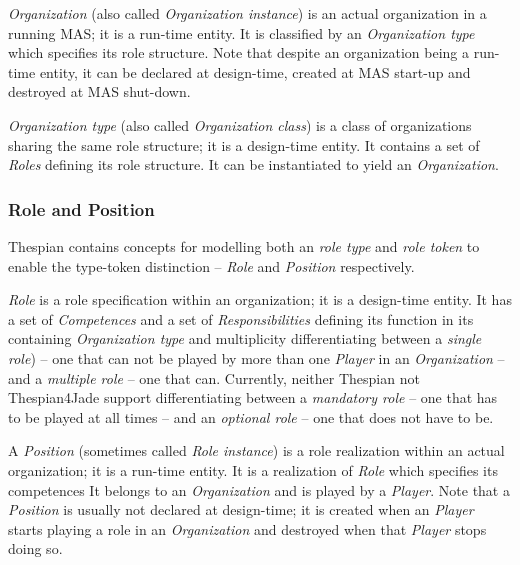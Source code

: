\textit{Organization} (also called \textit{Organization instance}) is an actual organization in a running MAS; it is a run-time entity.
It is classified by an \textit{Organization type} which specifies its role structure.
Note that despite an organization being a run-time entity, it can be declared at design-time, created at MAS start-up and destroyed at MAS shut-down.

\textit{Organization type} (also called \textit{Organization class}) is a class of organizations sharing the same role structure; it is a design-time entity.
It contains a set of \textit{Roles} defining its role structure.
It can be instantiated to yield an \textit{Organization}. 

\subsubsection*{Role and Position}

Thespian contains concepts for modelling both an \textit{role type} and \textit{role token} to enable the type-token distinction -- \textit{Role} and \textit{Position} respectively.

\textit{Role} is a role specification within an organization; it is a design-time entity.
It has a set of \textit{Competences} and a set of \textit{Responsibilities} defining its function in its containing \textit{Organization type} and multiplicity differentiating between a \textit{single role}) -- one that can not be played by more than one \textit{Player} in an \textit{Organization} -- and a \textit{multiple role} -- one that can.
Currently, neither Thespian not Thespian4Jade support differentiating between a \textit{mandatory role} -- one that has to be played at all times -- and an \textit{optional role} -- one that does not have to be.

A \textit{Position} (sometimes called \textit{Role instance}) is a role realization within an actual organization; it is a run-time entity.
It is a realization of \textit{Role} which specifies its competences
It belongs to an \textit{Organization} and is played by a \textit{Player}.
Note that a \textit{Position} is usually not declared at design-time; it is created when an \textit{Player} starts playing a role in an \textit{Organization} and destroyed when that \textit{Player} stops doing so.

